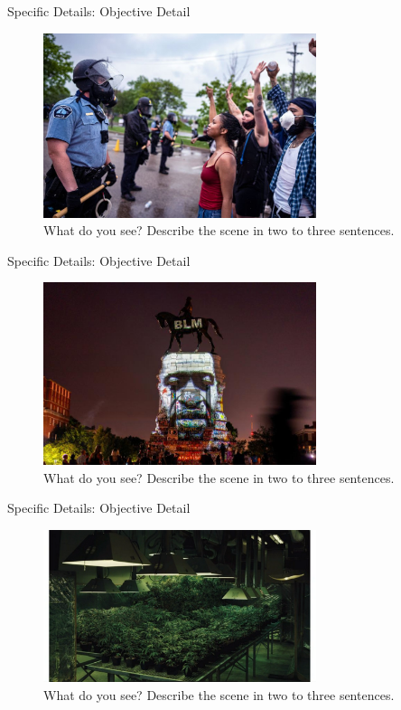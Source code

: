 \documentclass{beamer}
\begin{document}
\begin{frame}{Specific Details: Objective Detail}
\begin{figure}
\centering
\includegraphics[width=8cm]{figures/passion1.jpg}
\caption{\label{fig:obj1} What do you see?  Describe the scene in two to three sentences.}
\end{figure}
\end{frame}

\begin{frame}{Specific Details: Objective Detail}
\begin{figure}
\centering
\includegraphics[width=8cm]{figures/statue.jpeg}
\caption{\label{fig:obj2} What do you see?  Describe the scene in two to three sentences.}
\end{figure}
\end{frame}

\begin{frame}{Specific Details: Objective Detail}
\begin{figure}
\centering
\includegraphics[width=8cm]{figures/weed.png}
\caption{\label{fig:obj3} What do you see?  Describe the scene in two to three sentences.}
\end{figure}
\end{frame}
\end{document}
